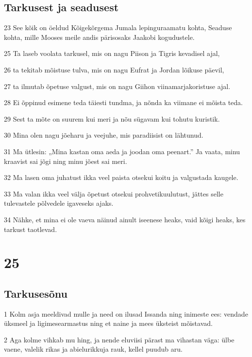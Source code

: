 \section*{Tarkusest ja seadusest}

\par 23 See kõik on öeldud Kõigekõrgema Jumala lepinguraamatu kohta, Seaduse kohta, mille Mooses meile andis pärisosaks Jaakobi kogudustele.
\par 25 Ta laseb voolata tarkusel, mis on nagu Piison ja Tigris kevadisel ajal,
\par 26 ta tekitab mõistuse tulva, mis on nagu Eufrat ja Jordan lõikuse päevil,
\par 27 ta ilmutab õpetuse valgust, mis on nagu Giihon viinamarjakoristuse ajal.
\par 28 Ei õppinud esimene teda täiesti tundma, ja nõnda ka viimane ei mõista teda.
\par 29 Sest ta mõte on suurem kui meri ja nõu sügavam kui tohutu kuristik.
\par 30 Mina olen nagu jõeharu ja veejuhe, mis paradiisist on lähtunud.
\par 31 Ma ütlesin: „Mina kastan oma aeda ja joodan oma peenart.” Ja vaata, minu kraavist sai jõgi ning minu jõest sai meri.
\par 32 Ma lasen oma juhatust ikka veel paista otsekui koitu ja valgustada kaugele.
\par 33 Ma valan ikka veel välja õpetust otsekui prohvetikuulutust, jättes selle tulevastele põlvedele igaveseks ajaks.
\par 34 Nähke, et mina ei ole vaeva näinud ainult iseenese heaks, vaid kõigi heaks, kes tarkust taotlevad.

\chapter{25}

\section*{Tarkusesõnu}

\par 1 Kolm asja meeldivad mulle ja need on ilusad Issanda ning inimeste ees: vendade üksmeel ja ligimesearmastus ning et naine ja mees üksteist mõistavad.
\par 2 Aga kolme vihkab mu hing, ja nende eluviisi pärast ma vihastan väga: ülbe vaene, valelik rikas ja abielurikkuja rauk, kellel puudub aru.

